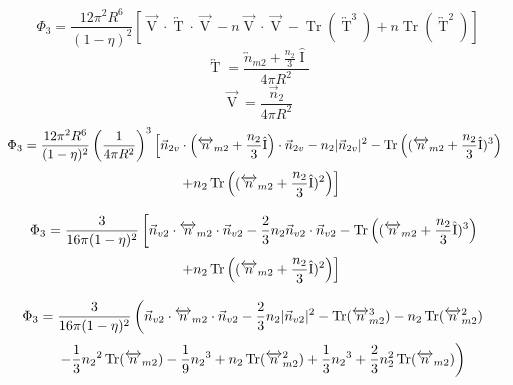 \documentclass[letterpaper,twocolumn,amsmath,amssymb,prb]{revtex4-1}
\begin{document}
\begin{widetext}
\begin{equation}{\Phi_3=\frac{12\pi^2R^6}{(1-\eta)^2}\left[\overrightarrow{\operatorname{V}}\cdot\overleftrightarrow{\operatorname{T}}\cdot\overrightarrow{\operatorname{V}}-n\overrightarrow{\operatorname{V}}\cdot\overrightarrow{\operatorname{V}}-\operatorname{Tr}\left(\overleftrightarrow{\operatorname{T}}^3\right)+n\operatorname{Tr}\left(\overleftrightarrow{\operatorname{T}}^2\right)\right]}\end{equation}
\[{}\]
\begin{equation}{\overleftrightarrow{\operatorname{T}}=\frac{{\overleftrightarrow{n}_{m2}}+\frac{n_2}{3}\hat{\operatorname{I}}}{4\pi{R}^2}}\end{equation}
\[{}\]
\begin{equation}{\overrightarrow{\operatorname{V}}=\frac{\vec{n}_2}{4\pi{R}^2}}\end{equation}
\[{}\]
\begin{displaymath}{\Phi_3=\frac{12\pi^2R^6}{(1-\eta)^2}\left(\frac{1}{4\pi{R}^2}\right)^3\left[\vec{n}_{2v}\cdot\left({\overleftrightarrow{n}_{m2}}+\frac{n_2}{3}\hat{\operatorname{I}}\right)\cdot\vec{n}_{2v}-n_2|\vec{n}_{2v}|^2-\operatorname{Tr}\left(({\overleftrightarrow{n}_{m2}}+\frac{n_2}{3}\hat{\operatorname{I}})^3\right)\color{white}\right]\color{black}}\end{displaymath}
\begin{equation}{\color{white}\left[\color{black}+n_2\operatorname{Tr}\left(({\overleftrightarrow{n}_{m2}}+\frac{n_2}{3}\hat{\operatorname{I}})^2\right)\right]}\end{equation}
\[{}\]
\begin{displaymath}{\Phi_3=\frac{3}{16\pi(1-\eta)^2}\left[\vec{n}_{v2}\cdot{\overleftrightarrow{n}_{m2}}\cdot{\vec{n}_{v2}}-\frac{2}{3}n_2\vec{n}_{v2}\cdot\vec{n}_{v2}-\operatorname{Tr}\left(({\overleftrightarrow{n}_{m2}}+\frac{n_2}{3}\hat{\operatorname{I}})^3\right)\color{white}\right]\color{black}}\end{displaymath}\begin{equation}{\color{white}\left[\color{black}+n_2\operatorname{Tr}\left((\overleftrightarrow{n}_{m2}+\frac{n_2}{3}\hat{\operatorname{I}})^2\right)\right]}\end{equation}
\[{}\]
\begin{displaymath}{\Phi_3=\frac{3}{16\pi(1-\eta)^2}\left(\vec{n}_{v2}\cdot{\overleftrightarrow{n}_{m2}}\cdot{\vec{n}_{v2}}-\frac{2}{3}n_2|\vec{n}_{v2}|^2-\operatorname{Tr}({\overleftrightarrow{n}_{m2}^3})
-n_2\operatorname{Tr}(\overleftrightarrow{n}_{m2}^2)\color{white}\right)\color{black}}\end{displaymath} \begin{equation}{\color{white}\left(\color{black}-\frac{1}{3}{n_2}^2\operatorname{Tr}(\overleftrightarrow{n}_{m2})-\frac{1}{9}{n_2}^3+n_2\operatorname{Tr}(\overleftrightarrow{n}_{m2}^2)+\frac{1}{3}{n_2}^3+\frac{2}{3}n^2_2\operatorname{Tr}(\overleftrightarrow{n}_{m2})\right)}\end{equation} 

\end{widetext}
\end{document}
